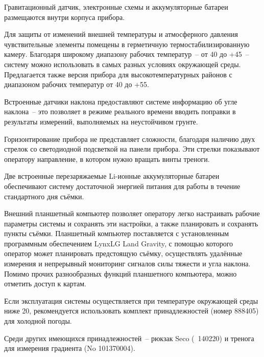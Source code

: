 Гравитационный датчик, электронные схемы и аккумуляторные батареи размещаются
внутри корпуса прибора.

Для защиты от изменений внешней температуры и атмосферного давления
чувствительные элементы \cg{} помещены в герметичную
термостабилизированную камеру. Благодаря широкому диапазону рабочих
температур~-- от \textminus{}40\textcelsius{} до +45\textcelsius{}~-- систему
\cg{} можно использовать в самых разных условиях окружающей
среды. Предлагается также версия прибора для высокотемпературных районов с
диапазоном рабочих температур от \textminus{}40\textcelsius{} до
+55\textcelsius{}.

Встроенные датчики наклона предоставляют системе \cg{}
информацию об угле наклона~-- это позволяет в режиме реального времени вводить
поправки в результаты измерений, выполняемых на неустойчивом грунте.

Горизонтирование прибора \cg{} не представляет сложности,
благодаря наличию двух стрелок со светодиодной подсветкой на панели прибора. Эти
стрелки показывают оператору направление, в котором нужно вращать винты треноги.

Две встроенные перезаряжаемые Li-ионные аккумуляторные батареи обеспечивают
систему \cg{} достаточной энергией питания для работы в
течение стандартного дня съёмки.

Внешний планшетный компьютер позволяет оператору легко настраивать рабочие
параметры системы \cg{} и сохранять эти настройки, а также
планировать и сохранять пункты съёмки. Планшетный компьютер поставляется с
установленным программным обеспечением LynxLG Land Gravity, с помощью
которого оператор может планировать предстоящую съёмку, осуществлять
удалённые измерения и непрерывный мониторинг сигналов силы тяжести и угла
наклона. Помимо прочих разнообразных функций планшетного компьютера, можно
отметить доступ к картам.

Если эксплуатация системы осуществляется при температуре окружающей среды ниже
\textminus{}20\textcelsius{}, рекомендуется использовать комплект
принадлежностей (номер 888405) для холодной погоды.

Среди других имеющихся принадлежностей~-- рюкзак Seco (\textnumero{}~140220) и тренога
для измерения градиента (No 101370004).
